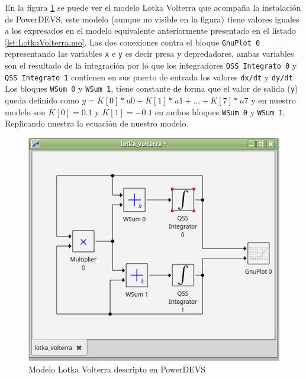 	En la figura \ref{fig:lk-powerdevs} se puede ver el modelo Lotka Volterra que acompaña la instalación de PowerDEVS, este modelo (aunque no visible en la figura)
	tiene valores iguales a los expresados en el modelo equivalente anteriormente presentado en el listado \ref{lst:LotkaVolterra.mo}. 
	Las dos conexiones contra el bloque \texttt{GnuPlot 0} representando las variables \texttt{x} e \texttt{y} es decir presa y depredadores, ambas variables 
	son el resultado de la integración por lo que los integradores \texttt{QSS Integrato 0} y \texttt{QSS Integrato 1} contienen en sus puerto de entrada los 
	valores \texttt{dx/dt} y \texttt{dy/dt}. 
	Los bloques \texttt{WSum 0} y \texttt{WSum 1}, tiene constante de forma que el valor de salida (\texttt{y}) queda definido como
	$y = K[0] * u0 + K[1] * u1 + \dots + K[7] * u7$ y en nuestro modelo son $K[0] = 0.1$ y $K[1] = -0.1$ en ambos bloques \texttt{WSum 0} y \texttt{WSum 1}.
	Replicando nuestra la ecuación de nuestro modelo.
	

	\begin{figure}[!htbp]
	  \includegraphics[width=\textwidth]{lk-powerdevs}
	  \caption{Modelo Lotka Volterra descripto en PowerDEVS}
	   \label{fig:lk-powerdevs}
	\end{figure}

